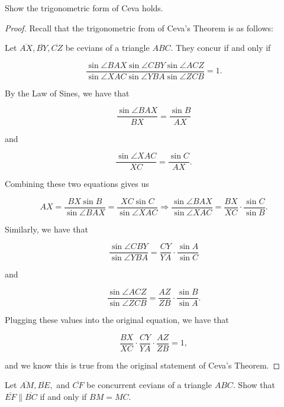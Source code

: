 \documentclass[letterpaper,oneside]{scrartcl}
\begin{document}
\begin{problem*}
  [3.5]
  Show the trigonometric form of Ceva holds.
\end{problem*}

\begin{proof}  Recall that the trigonometric from of Ceva's Theorem is as follows:

  Let $\overline{AX}, \overline{BY}, \overline{CZ}$ be cevians of a triangle $ABC.$ They concur if and only if

  $$\frac{\sin \angle BAX \sin \angle CBY \sin \angle ACZ}{\sin \angle XAC \sin \angle YBA \sin \angle ZCB} = 1.$$

  By the Law of Sines, we have that

  $$\frac{\sin\angle BAX}{BX} = \frac{\sin B}{AX}$$

  and

  $$\frac{\sin\angle XAC}{XC} = \frac{\sin C}{AX}.$$

  Combining these two equations gives us

  $$AX = \frac{BX \sin B}{\sin\angle BAX}=\frac{XC \sin C}{\sin\angle XAC} \Rightarrow \frac{\sin \angle BAX}{\sin \angle XAC} = \frac{BX}{XC} \cdot \frac{\sin C}{\sin B}.$$

  Similarly, we have that

  $$\frac{\sin \angle CBY}{\sin \angle YBA} = \frac{CY}{YA}\cdot \frac{\sin A}{\sin C} $$

  and

  $$
    \frac{\sin \angle ACZ}{\sin \angle ZCB} = \frac{AZ}{ZB}\cdot \frac{\sin B}{\sin A}. $$

  Plugging these values into the original equation, we have that

  $$\frac{BX}{XC}\cdot \frac{CY}{YA} \cdot \frac{AZ}{ZB} = 1,$$

  and we know this is true from the original statement of Ceva's Theorem.
\end{proof}

\begin{problem*}
  [3.6]
  Let $\overline{AM}, \overline{BE},$ and $\overline{CF}$ be concurrent cevians of a triangle $ABC.$ Show that $\overline{EF} \parallel \overline{BC}$ if and only if $BM = MC.$
\end{problem*}
\end{document}
